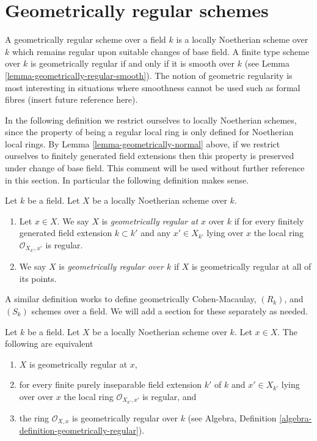 \section{Geometrically regular schemes}
\label{section-geometrically-regular}

\noindent
A geometrically regular scheme over a field $k$ is a locally Noetherian
scheme over $k$ which remains regular upon suitable changes of base field.
A finite type scheme over $k$ is geometrically regular if and only
if it is smooth over $k$ (see Lemma \ref{lemma-geometrically-regular-smooth}).
The notion of geometric regularity is most interesting in situations
where smoothness cannot be used such as formal fibres (insert future
reference here).

\medskip\noindent
In the following definition we restrict ourselves to locally Noetherian
schemes, since the property of being a regular local ring is only
defined for Noetherian local rings. By Lemma \ref{lemma-geometrically-normal}
above, if we restrict ourselves to finitely generated field extensions then
this property is preserved under change of base field. This comment will be
used without further reference in this section. In particular the following
definition makes sense.

\begin{definition}
\label{definition-geometrically-regular}
Let $k$ be a field. Let $X$ be a locally Noetherian scheme over $k$.
\begin{enumerate}
\item Let $x \in X$. We say $X$ is {\it geometrically regular at $x$}
over $k$ if for every finitely generated field extension $k \subset k'$
and any $x' \in X_{k'}$ lying over $x$ the local ring
$\mathcal{O}_{X_{k'}, x'}$ is regular.
\item We say $X$ is {\it geometrically regular over $k$} if
$X$ is geometrically regular at all of its points.
\end{enumerate}
\end{definition}

\noindent
A similar definition works to define geometrically
Cohen-Macaulay, $(R_k)$, and $(S_k)$ schemes over a field.
We will add a section for these separately as needed.

\begin{lemma}
\label{lemma-geometrically-regular-at-point}
Let $k$ be a field.
Let $X$ be a locally Noetherian scheme over $k$.
Let $x \in X$.
The following are equivalent
\begin{enumerate}
\item $X$ is geometrically regular at $x$,
\item for every finite purely inseparable field extension $k'$ of $k$
and $x' \in X_{k'}$ lying over over $x$ the local ring
$\mathcal{O}_{X_{k'}, x'}$ is regular, and
\item the ring $\mathcal{O}_{X, x}$ is geometrically
regular over $k$ (see
Algebra, Definition \ref{algebra-definition-geometrically-regular}).
\end{enumerate}
\end{lemma}


